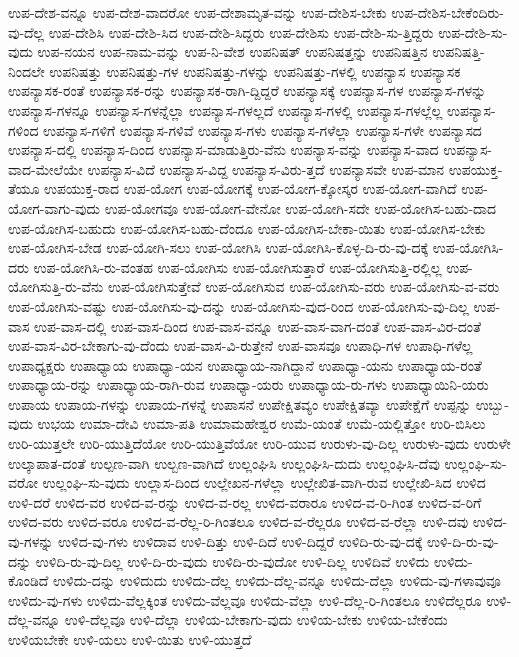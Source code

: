 {ಉಪ-ದೇಶ-ವನ್ನೂ
ಉಪ-ದೇಶ-ವಾದರೋ
ಉಪ-ದೇಶಾಮೃತ-ವನ್ನು
ಉಪ-ದೇಶಿಸ-ಬೇಕು
ಉಪ-ದೇಶಿಸ-ಬೇಕೆಂದಿರು-ವು-ದೆಲ್ಲ
ಉಪ-ದೇಶಿಸಿ
ಉಪ-ದೇಶಿ-ಸಿದ
ಉಪ-ದೇಶಿ-ಸಿದ್ದರು
ಉಪ-ದೇಶಿಸು
ಉಪ-ದೇಶಿ-ಸು-ತ್ತಿದ್ದರು
ಉಪ-ದೇಶಿ-ಸು-ವುದು
ಉಪ-ನಯನ
ಉಪ-ನಾಮ-ವನ್ನು
ಉಪ-ನಿ-ವೇಶ
ಉಪನಿಷತ್
ಉಪನಿಷತ್ತನ್ನು
ಉಪನಿಷತ್ತಿನ
ಉಪನಿಷತ್ತಿ-ನಿಂದಲೇ
ಉಪನಿಷತ್ತು
ಉಪನಿಷತ್ತು-ಗಳ
ಉಪನಿಷತ್ತು-ಗಳನ್ನು
ಉಪನಿಷತ್ತು-ಗಳಲ್ಲಿ
ಉಪನ್ಯಾಸ
ಉಪನ್ಯಾಸಕ
ಉಪನ್ಯಾಸಕ-ರಂತೆ
ಉಪನ್ಯಾಸಕ-ರನ್ನು
ಉಪನ್ಯಾಸಕ-ರಾಗಿ-ದ್ದಿದ್ದರೆ
ಉಪನ್ಯಾಸಕ್ಕೆ
ಉಪನ್ಯಾಸ-ಗಳ
ಉಪನ್ಯಾಸ-ಗಳನ್ನು
ಉಪನ್ಯಾಸ-ಗಳನ್ನೂ
ಉಪನ್ಯಾಸ-ಗಳನ್ನೆಲ್ಲಾ
ಉಪನ್ಯಾಸ-ಗಳಲ್ಲದೆ
ಉಪನ್ಯಾಸ-ಗಳಲ್ಲಿ
ಉಪನ್ಯಾಸ-ಗಳಲ್ಲೆಲ್ಲ
ಉಪನ್ಯಾಸ-ಗಳಿಂದ
ಉಪನ್ಯಾಸ-ಗಳಿಗೆ
ಉಪನ್ಯಾಸ-ಗಳಿವೆ
ಉಪನ್ಯಾಸ-ಗಳು
ಉಪನ್ಯಾಸ-ಗಳೆಲ್ಲಾ
ಉಪನ್ಯಾಸ-ಗಳೇ
ಉಪನ್ಯಾಸದ
ಉಪನ್ಯಾಸ-ದಲ್ಲಿ
ಉಪನ್ಯಾಸ-ದಿಂದ
ಉಪನ್ಯಾಸ-ಮಾಡುತ್ತಿರು-ವೆನು
ಉಪನ್ಯಾಸ-ವನ್ನು
ಉಪನ್ಯಾಸ-ವಾದ
ಉಪನ್ಯಾಸ-ವಾದ-ಮೇಲೆಯೇ
ಉಪನ್ಯಾಸ-ವಿದೆ
ಉಪನ್ಯಾಸ-ವಿದ್ದ
ಉಪನ್ಯಾಸ-ವಿರು-ತ್ತದೆ
ಉಪನ್ಯಾಸವೇ
ಉಪ-ಮಾನ
ಉಪಯುಕ್ತ-ತೆಯೂ
ಉಪಯುಕ್ತ-ರಾದ
ಉಪ-ಯೋಗ
ಉಪ-ಯೋಗಕ್ಕೆ
ಉಪ-ಯೋಗ-ಕ್ಕೋಸ್ಕರ
ಉಪ-ಯೋಗ-ವಾಗಿದೆ
ಉಪ-ಯೋಗ-ವಾಗು-ವುದು
ಉಪ-ಯೋಗವೂ
ಉಪ-ಯೋಗ-ವೇನೋ
ಉಪ-ಯೋಗಿ-ಸದೇ
ಉಪ-ಯೋಗಿಸ-ಬಹು-ದಾದ
ಉಪ-ಯೋಗಿಸ-ಬಹುದು
ಉಪ-ಯೋಗಿಸ-ಬಹು-ದೆಂದೂ
ಉಪ-ಯೋಗಿಸ-ಬೇಕಾ-ಯಿತು
ಉಪ-ಯೋಗಿಸ-ಬೇಕು
ಉಪ-ಯೋಗಿಸ-ಬೇಡ
ಉಪ-ಯೋಗಿ-ಸಲು
ಉಪ-ಯೋಗಿಸಿ
ಉಪ-ಯೋಗಿಸಿ-ಕೊಳ್ಳ-ದಿ-ರು-ವು-ದಕ್ಕೆ
ಉಪ-ಯೋಗಿಸಿ-ದರು
ಉಪ-ಯೋಗಿಸಿ-ರು-ವಂತಹ
ಉಪ-ಯೋಗಿಸು
ಉಪ-ಯೋಗಿಸುತ್ತಾರೆ
ಉಪ-ಯೋಗಿಸುತ್ತಿ-ರಲ್ಲಿಲ್ಲ
ಉಪ-ಯೋಗಿಸುತ್ತಿ-ರು-ವೆನು
ಉಪ-ಯೋಗಿಸುತ್ತೇವೆ
ಉಪ-ಯೋಗಿಸುವ
ಉಪ-ಯೋಗಿಸು-ವರು
ಉಪ-ಯೋಗಿಸು-ವ-ವರು
ಉಪ-ಯೋಗಿಸು-ವಷ್ಟು
ಉಪ-ಯೋಗಿಸು-ವು-ದನ್ನು
ಉಪ-ಯೋಗಿಸು-ವುದ-ರಿಂದ
ಉಪ-ಯೋಗಿಸು-ವು-ದಿಲ್ಲ
ಉಪ-ವಾಸ
ಉಪ-ವಾಸ-ದಲ್ಲಿ
ಉಪ-ವಾಸ-ದಿಂದ
ಉಪ-ವಾಸ-ವನ್ನೂ
ಉಪ-ವಾಸ-ವಾಗ-ದಂತೆ
ಉಪ-ವಾಸ-ವಿರ-ದಂತೆ
ಉಪ-ವಾಸ-ವಿರ-ಬೇಕಾಗು-ವು-ದೆಂದು
ಉಪ-ವಾಸ-ವಿ-ರುತ್ತೇನೆ
ಉಪ-ವಾಸವೂ
ಉಪಾಧಿ-ಗಳ
ಉಪಾಧಿ-ಗಳೆಲ್ಲ
ಉಪಾಧ್ಯಕ್ಷರು
ಉಪಾಧ್ಯಾಯ
ಉಪಾಧ್ಯಾ-ಯನ
ಉಪಾಧ್ಯಾಯ-ನಾಗಿದ್ದಾನೆ
ಉಪಾಧ್ಯಾ-ಯನು
ಉಪಾಧ್ಯಾಯ-ರಂತೆ
ಉಪಾಧ್ಯಾಯ-ರನ್ನು
ಉಪಾಧ್ಯಾಯ-ರಾಗಿ-ರುವ
ಉಪಾಧ್ಯಾ-ಯರು
ಉಪಾಧ್ಯಾಯ-ರು-ಗಳು
ಉಪಾಧ್ಯಾಯಿನಿ-ಯರು
ಉಪಾಯ
ಉಪಾಯ-ಗಳನ್ನು
ಉಪಾಯ-ಗಳನ್ನೆ
ಉಪಾಸನೆ
ಉಪೇಕ್ಷಿತವ್ಯಂ
ಉಪೇಕ್ಷಿತವ್ಯಾ
ಉಪೇಕ್ಷೆಗೆ
ಉಪ್ಪನ್ನು
ಉಬ್ಬು-ವುದು
ಉಭಯ
ಉಮಾ-ದೇವಿ
ಉಮಾ-ಪತಿ
ಉಮಾಮಹೇಶ್ವರ
ಉಮೆ-ಯಂತೆ
ಉಮೆ-ಯಲ್ಲಿತ್ತೋ
ಉರಿ-ಬಿಸಿಲು
ಉರಿ-ಯುತ್ತಲೇ
ಉರಿ-ಯುತ್ತಿದೆಯೋ
ಉರಿ-ಯುತ್ತಿವೆಯೋ
ಉರಿ-ಯುವ
ಉರುಳು-ವು-ದಿಲ್ಲ
ಉರುಳು-ವುದು
ಉರುಳೇ
ಉಲ್ಕಾಪಾತ-ದಂತೆ
ಉಲ್ಪಣ-ವಾಗಿ
ಉಲ್ಬಣ-ವಾಗಿದೆ
ಉಲ್ಲಂಘಿಸಿ
ಉಲ್ಲಂಘಿಸಿ-ದುದು
ಉಲ್ಲಂಘಿಸಿ-ದೆವು
ಉಲ್ಲಂಘಿ-ಸು-ವರೋ
ಉಲ್ಲಂಘಿ-ಸು-ವುದು
ಉಲ್ಲಾಸ-ದಿಂದ
ಉಲ್ಲೇಖನ-ಗಳೆಲ್ಲಾ
ಉಲ್ಲೇಖಿತ-ವಾಗಿ-ರುವ
ಉಲ್ಲೇಖಿ-ಸಿದ
ಉಳಿದ
ಉಳಿ-ದರೆ
ಉಳಿದ-ವರ
ಉಳಿದ-ವ-ರನ್ನು
ಉಳಿದ-ವ-ರಲ್ಲ
ಉಳಿದ-ವರಾರೂ
ಉಳಿದ-ವ-ರಿ-ಗಿಂತ
ಉಳಿದ-ವ-ರಿಗೆ
ಉಳಿದ-ವರು
ಉಳಿದ-ವರೂ
ಉಳಿದ-ವ-ರೆಲ್ಲ-ರಿ-ಗಿಂತಲೂ
ಉಳಿದ-ವ-ರೆಲ್ಲರೂ
ಉಳಿದ-ವ-ರೆಲ್ಲಾ
ಉಳಿ-ದವು
ಉಳಿದ-ವು-ಗಳನ್ನು
ಉಳಿದ-ವು-ಗಳು
ಉಳಿದಾವ
ಉಳಿ-ದಿತ್ತು
ಉಳಿ-ದಿದೆ
ಉಳಿ-ದಿದ್ದರೆ
ಉಳಿದಿ-ರು-ವು-ದಕ್ಕೆ
ಉಳಿ-ದಿ-ರು-ವು-ದನ್ನು
ಉಳಿದಿ-ರು-ವು-ದಿಲ್ಲ
ಉಳಿ-ದಿ-ರು-ವುದು
ಉಳಿದಿ-ರು-ವುದೋ
ಉಳಿ-ದಿಲ್ಲ
ಉಳಿದಿವೆ
ಉಳಿದು
ಉಳಿದು-ಕೊಂಡಿದೆ
ಉಳಿದು-ದನ್ನು
ಉಳಿದುದು
ಉಳಿದು-ದೆಲ್ಲ
ಉಳಿದು-ದೆಲ್ಲ-ವನ್ನೂ
ಉಳಿದು-ದೆಲ್ಲಾ
ಉಳಿದು-ವು-ಗಳಾವುವೂ
ಉಳಿದು-ವು-ಗಳು
ಉಳಿದು-ವೆಲ್ಲಕ್ಕಿಂತ
ಉಳಿದು-ವೆಲ್ಲವೂ
ಉಳಿದು-ವೆಲ್ಲಾ
ಉಳಿ-ದೆಲ್ಲ-ರಿ-ಗಿಂತಲೂ
ಉಳಿದೆಲ್ಲರೂ
ಉಳಿ-ದೆಲ್ಲ-ವನ್ನೂ
ಉಳಿ-ದೆಲ್ಲವೂ
ಉಳಿ-ದೆಲ್ಲಾ
ಉಳಿಯ-ಬೇಕಾಗು-ವುದು
ಉಳಿಯ-ಬೇಕು
ಉಳಿಯ-ಬೇಕೆಂದು
ಉಳಿಯಬೇಕೇ
ಉಳಿ-ಯಲು
ಉಳಿ-ಯಿತು
ಉಳಿ-ಯುತ್ತದೆ
}
